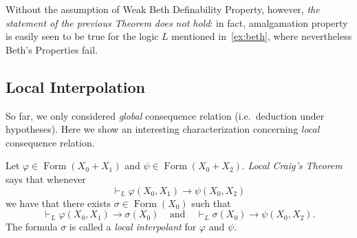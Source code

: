 \documentclass{article}
\newtheorem{prop}{Proposition}
\theoremstyle{definition}
\DeclareMathOperator{\Formulas}{Form}
\DeclareMathOperator{\internal}{\delta^i}
\DeclareMathOperator{\external}{\delta^e}
\DeclareMathOperator{\height}{ht}
\DeclareMathOperator{\width}{wt}
\DeclareMathOperator{\confluent}{e}
\newcommand{\KFr}{\textup{\textbf{KFr}}}
\newcommand{\PreO}{\textup{\textbf{PreO}}}
\newcommand{\Pos}{\textup{\textbf{Pos}}}
\newcommand{\MA}{\textup{\textbf{MA}}}
\newcommand{\lf}{\textit{lf}}
\begin{document}
Without the assumption  of Weak Beth Definability Property, however, \emph{the statement of the previous Theorem does not hold}: in fact, amalgamation property is easily seen to be true for the logic $L$ mentioned in~\cref{ex:beth}, where nevertheless Beth's Properties fail.




 

\subsection{Local Interpolation}

So far, we only considered \emph{global} consequence relation (i.e.\ deduction under hypotheses). Here we show an interesting characterization concerning \emph{local} consequence relation.


 Let $\varphi \in \Formulas(X_0+X_1)$ and $\psi \in \Formulas(X_0+X_2)$.  \emph{Local Craig's Theorem} says that whenever
$$\vdash_L \varphi(X_0,X_1)\to  \psi(X_0,X_2)$$
we have that there exists $\sigma \in \Formulas(X_0)$ such that
$$\vdash_L\varphi(X_0,X_1) \to \sigma(X_0) ~~~~~\text{and}~~~~~ \vdash_L \sigma(X_0) \to \psi(X_0,X_2).$$
The formula $\sigma$ is called a \emph{local interpolant} for $\varphi$ and $\psi$.
\end{document}
